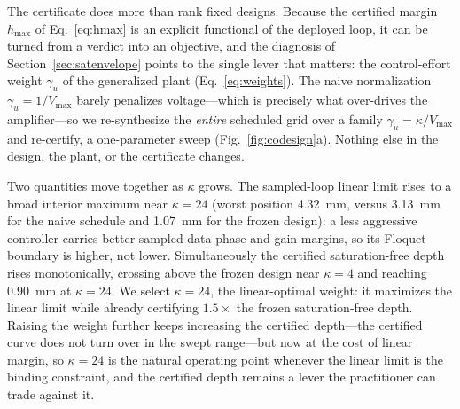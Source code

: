 \documentclass[preprint,12pt]{elsarticle}
\begin{document}
The certificate does more than rank fixed designs. Because the certified
margin $h_{\max}$ of Eq.~\eqref{eq:hmax} is an explicit functional of the
deployed loop, it can be turned from a verdict into an objective, and the
diagnosis of Section~\ref{sec:satenvelope} points to the single lever
that matters: the control-effort weight $\gamma_u$ of the generalized
plant (Eq.~\eqref{eq:weights}). The naive normalization
$\gamma_u = 1/V_{\max}$ barely penalizes voltage---which is precisely
what over-drives the amplifier---so we re-synthesize the \emph{entire}
scheduled grid over a family $\gamma_u = \kappa/V_{\max}$ and re-certify,
a one-parameter sweep (Fig.~\ref{fig:codesign}a). Nothing else in the
design, the plant, or the certificate changes.

Two quantities move together as $\kappa$ grows. The sampled-loop linear
limit rises to a broad interior maximum near $\kappa = 24$ (worst
position 4.32~mm, versus 3.13~mm for the naive schedule and 1.07~mm for
the frozen design): a less aggressive controller carries better
sampled-data phase and gain margins, so its Floquet boundary is higher,
not lower. Simultaneously the certified saturation-free depth rises
monotonically, crossing above the frozen design near $\kappa = 4$ and
reaching 0.90~mm at $\kappa = 24$. We select $\kappa = 24$, the
linear-optimal weight: it maximizes the linear limit while already
certifying $1.5\times$ the frozen saturation-free depth. Raising the
weight further keeps increasing the certified depth---the certified
curve does not turn over in the swept range---but now at the cost of
linear margin, so $\kappa = 24$ is the natural operating point whenever
the linear limit is the binding constraint, and the certified depth
remains a lever the practitioner can trade against it.
\end{document}

